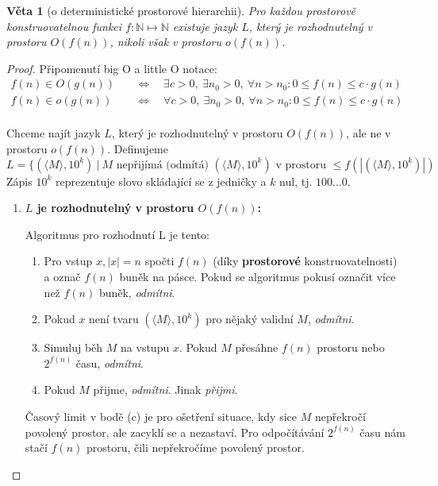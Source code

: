 \documentclass[11pt]{report} %
\newcommand{\N}{\mathbb{N}}
\newtheorem{theorem}{Věta}[section]
\numberwithin{equation}{section}
\begin{document}
\begin{theorem}[o deterministické prostorové hierarchii]
Pro každou prostorově konstruovatelnou funkci $f : \N \mapsto \N$ existuje jazyk $L$, který je rozhodnutelný v prostoru $O(f(n))$, nikoli však v prostoru $o(f(n))$.
\end{theorem}

\begin{proof}
	Připomenutí big O a little O notace:
	\begin{align*}
		f(n) \in O(g(n)) \quad &\Leftrightarrow \quad \exists c > 0,\ \exists n_0 > 0,\ \forall n>n_0 : 0 \leq f(n) \leq c\cdot g(n) \\
		f(n) \in o(g(n)) \quad &\Leftrightarrow \quad \forall c > 0,\ \exists n_0 > 0,\ \forall n>n_0 : 0 \leq f(n) \leq c\cdot g(n) \\
	\end{align*}
	
	Chceme najít jazyk $L$, který je rozhodnutelný v prostoru $O(f(n))$, ale ne v prostoru $o(f(n))$. Definujeme 
	$$L = \{(\langle M \rangle, 10^k)\ |\ M \text{ nepřijímá (odmítá) } (\langle M \rangle, 10^k) \text{ v prostoru }\leq f(|(\langle M \rangle, 10^k)|) $$
	Zápis $10^k$ reprezentuje slovo skládající se z jedničky a $k$ nul, tj. $100\dots0$.
	
	\begin{enumerate}
		\item \textbf{$L$ je rozhodnutelný v prostoru $O(f(n))$:}
		
		Algoritmus pro rozhodnutí L je tento:
		\begin{enumerate}
			
			
			\item Pro vstup $x, |x| = n$ spočti $f(n)$ (díky \textbf{prostorové} konstruovatelnosti) a označ $f(n)$ buněk na pásce. Pokud se algoritmus pokusí označit více než $f(n)$ buněk, \textit{odmítni}.
			\item Pokud $x$ není tvaru $(\langle M \rangle, 10^k)$ pro nějaký validní $M$, \textit{odmítni}.
			\item Simuluj běh $M$ na vstupu $x$. Pokud $M$ přesáhne $f(n)$ prostoru nebo $2^{f(n)}$ času, \textit{odmítni}.
			\item Pokud $M$ přijme, \textit{odmítni}. Jinak \textit{přijmi}.
		\end{enumerate}
		Časový limit v bodě (c) je pro ošetření situace, kdy sice $M$ nepřekročí povolený prostor, ale zacyklí se a nezastaví. Pro odpočítávání $2^{f(n)}$ času nám stačí $f(n)$ prostoru, čili nepřekročíme povolený prostor.
		

\end{enumerate}
\end{proof}
\end{document}
